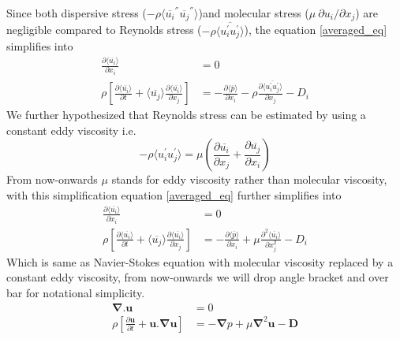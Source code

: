 \documentclass[12pt]{report}   %
\newcommand{\bu}{\mathbf{u}}
\newcommand{\grad}{\mathbf{\nabla}}
\newcommand{\del}{\partial}
\renewcommand{\bar}{\overline}
\begin{document}
 Since both dispersive stress ($-\rho \langle \bar{u_i}^{''} \bar{u_j}^{''} \rangle $)and molecular stress ($ \mu\ \del u_i / \del x_j $) are negligible compared to Reynolds stress ($-\rho \langle\bar{ u_i^{'} u_j^{'} } \rangle $), the equation \ref{averaged_eq} simplifies into
 \begin{equation}\label{averaged_eq2}
  \begin{split}
  \frac{\partial \langle \bar{u_i} \rangle}{\partial x_i}&=0 \\
 \rho \left[ \frac{\partial \langle \overline{u_i} \rangle }{\partial t}+ \langle \overline{u_j} \rangle \frac{\partial \langle \bar{u_i} \rangle}{\partial x_j} \right ] &= -\frac{\partial \langle \bar{p} \rangle  }{\partial x_i} -\rho \frac{\partial \langle \bar{u_i^{'}u_j^{'}} \rangle }{\partial x_j} -D_i
 \end{split}
\end{equation}
We further hypothesized that Reynolds stress can be estimated by using a constant eddy viscosity i.e. 
\[ -\rho \langle u_i^{'} u_j^{'} \rangle = \mu \left(\frac{\del \bar{u_i} }{\del x_j} + \frac{\del \bar {u_j} }{\del x_i}  \right)\]
From now-onwards $\mu$ stands for eddy viscosity rather than molecular viscosity, with this simplification equation \ref{averaged_eq} further simplifies into
 \begin{equation}\label{averaged_eq3}
  \begin{split}
  \frac{\partial \langle \bar{u_i} \rangle}{\partial x_i}&=0 \\
 \rho \left[ \frac{\partial \langle \overline{u_i} \rangle }{\partial t}+ \langle \overline{u_j} \rangle \frac{\partial \langle \bar{u_i} \rangle}{\partial x_j} \right ] &= -\frac{\partial \langle \bar{p} \rangle  }{\partial x_i} +\mu \frac{\partial^2 \langle \bar{u_i} \rangle }{\partial x_j^2} - D_i
 \end{split}
\end{equation}
Which is same as Navier-Stokes equation with molecular viscosity replaced by a constant eddy viscosity, from now-onwards we will drop angle bracket and over bar 
for notational simplicity.
\begin{equation}\label{averaged_eq}
\begin{split}
  \grad .{\bu}&=0 \\
 \rho \left[ \frac{\partial {\bu}  }{\partial t}+  {\bu} . \grad \bu  \right ] &= - \grad{p}  +\mu \grad^2\bu - \mathbf{D}
\end{split}
\end{equation}
\end{document}
